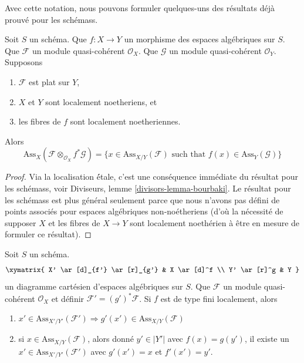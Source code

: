 \noindent
Avec cette notation, nous pouvons formuler quelques-uns des résultats
déjà prouvé pour les schémass.

\begin{lemma}
\label{lemma-bourbaki}
Soit $S$ un schéma.
Que $f : X \to Y$ un morphisme des espaces algébriques sur $S$.
Que $\mathcal{F}$ un module quasi-cohérent $\mathcal{O}_X$.
Que $\mathcal{G}$ un module quasi-cohérent $\mathcal{O}_Y$.
Supposons
\begin{enumerate}
\item $\mathcal{F}$ est plat sur $Y$,
\item $X$ et $Y$ sont localement noetheriens, et
\item les fibres de $f$ sont localement noetheriennes.
\end{enumerate}
Alors
$$
\text{Ass}_X(\mathcal{F} \otimes_{\mathcal{O}_X} f^*\mathcal{G}) =
\{x \in \text{Ass}_{X/Y}(\mathcal{F})\text{ such that }
f(x) \in \text{Ass}_Y(\mathcal{G}) \}
$$
\end{lemma}

\begin{proof}
Via la localisation \'étale, c'est une conséquence immédiate du résultat
pour les schémass, voir
Diviseurs, lemme \ref{divisors-lemma-bourbaki}.
Le résultat pour les schémass est plus général seulement parce que
nous n'avons pas défini de points associés pour
espaces algébriques non-noétheriens (d'où la nécessité de supposer $X$
et les fibres de $X \to Y$ sont localement noethérien à
être en mesure de formuler ce résultat).
\end{proof}

\begin{lemma}
\label{lemma-base-change-relative-assassin}
Soit $S$ un schéma.
$$
\xymatrix{
X' \ar[d]_{f'} \ar[r]_{g'} & X \ar[d]^f \\
Y' \ar[r]^g & Y
}
$$
un diagramme cartésien d'espaces algébriques sur $S$.
Que $\mathcal{F}$ un module quasi-cohérent $\mathcal{O}_X$
et définir $\mathcal{F}' = (g')^*\mathcal{F}$.
Si $f$ est de type fini localement, alors
\begin{enumerate}
\item $x' \in \text{Ass}_{X'/Y'}(\mathcal{F}')
\Rightarrow g'(x') \in \text{Ass}_{X/Y}(\mathcal{F})$
\item si $x \in \text{Ass}_{X/Y}(\mathcal{F})$, alors donné
$y' \in |Y'|$ avec $f(x) = g(y')$, il existe un
$x' \in \text{Ass}_{X'/Y'}(\mathcal{F}')$
avec $g'(x') = x$ et $f'(x') = y'$.
\end{enumerate}
\end{lemma}


